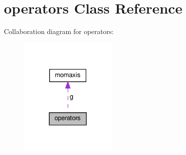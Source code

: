 \hypertarget{classoperators}{}\section{operators Class Reference}
\label{classoperators}


Collaboration diagram for operators\+:\nopagebreak
\begin{figure}[H]
\begin{center}
\leavevmode
\includegraphics[width=137pt]{classoperators__coll__graph}
\end{center}
\end{figure}
